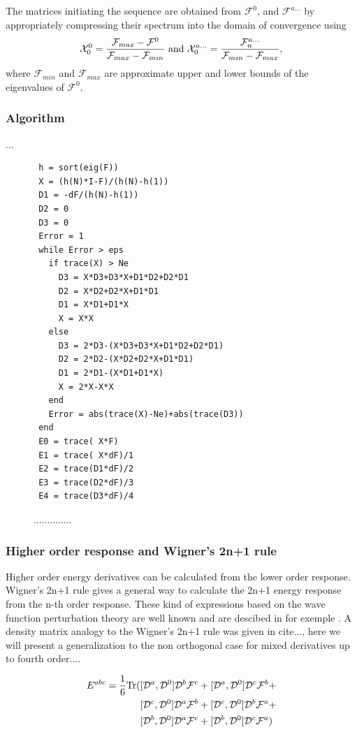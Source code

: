 \documentclass[prl,aps,twocolumn,showpacs,twocolumngrid,superbib]{revtex4}
\def\Tr{{\rm Tr}}
\def\F{\mathcal{F}}
\def\D{\mathcal{D}}
\def\X{\mathcal{X}}
\begin{document}
The matrices initiating the sequence are obtained from $\F^0$,
and $\F^{a\ldots}$ by appropriately
compressing their spectrum into the domain of convergence
\cite{ANiklasson02A} using
\begin{equation}
  \X^0_{0}=\frac{\F_{max}-\F^0}{\F_{max}-\F_{min}}~{\rm and}~
  \X^{a\ldots}_{0}=\frac{\F^{a\ldots}_{n}}{\F_{min}-\F_{max}},
\end{equation}
where $\F_{min}$ and $\F_{max}$ are approximate upper and lower 
bounds of the eigenvalues of $\F^0$.



\subsubsection{Algorithm}
...\\
\begin{figure}[htbp]
  \centering
  \caption{\protect
    ..............
  }\label{fig:algo}
\begin{verbatim}
 h = sort(eig(F))
 X = (h(N)*I-F)/(h(N)-h(1))
 D1 = -dF/(h(N)-h(1))
 D2 = 0
 D3 = 0
 Error = 1
 while Error > eps
   if trace(X) > Ne
     D3 = X*D3+D3*X+D1*D2+D2*D1
     D2 = X*D2+D2*X+D1*D1
     D1 = X*D1+D1*X
     X = X*X
   else
     D3 = 2*D3-(X*D3+D3*X+D1*D2+D2*D1)
     D2 = 2*D2-(X*D2+D2*X+D1*D1)
     D1 = 2*D1-(X*D1+D1*X)
     X = 2*X-X*X
   end
   Error = abs(trace(X)-Ne)+abs(trace(D3))
 end
 E0 = trace( X*F)
 E1 = trace( X*dF)/1
 E2 = trace(D1*dF)/2
 E3 = trace(D2*dF)/3
 E4 = trace(D3*dF)/4
\end{verbatim}
\end{figure}


\subsubsection{Higher order response and Wigner's 2n+1 rule }
Higher order energy derivatives can be calculated from the lower
order response. Wigner's 2n+1 rule gives a general way to calculate the 2n+1
energy response from the n-th order response. These kind of expressions
based on the wave function perturbation theory are well known and are 
descibed in for exemple \cite{Dupuis_1991}.
A density matrix analogy to 
the Wigner's 2n+1 rule was given in cite{...}, here we will present
a generalization to the non orthogonal case for mixed derivatives 
up to fourth order....



\begin{equation}
\begin{split}
  E^{abc}=\frac{1}{6}\Tr(&[\D^a,\D^0]\D^b\F^c+[\D^a,\D^0]\D^c\F^b+\\
                        &[\D^c,\D^0]\D^a\F^b+[\D^c,\D^0]\D^b\F^a+\\
                        &[\D^b,\D^0]\D^a\F^c+[\D^b,\D^0]\D^c\F^a)
\end{split}
\end{equation}
\end{document}
